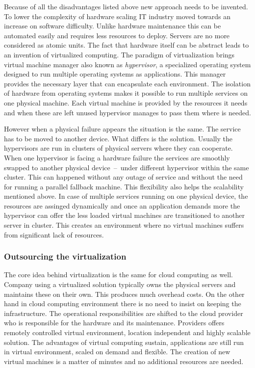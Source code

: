 Because of all the disadvantages listed above new approach needs to be invented. To lower the complexity of hardware scaling IT industry moved towards an increase on software difficulty. Unlike hardware maintenance this can be automated easily and requires less resources to deploy. Servers are no more considered as atomic units. The fact that hardware itself can be abstract leads to an invention of virtualized computing. The paradigm of virtualization brings virtual machine manager also known as \emph{hypervisor}, a specialized operating system designed to run multiple operating systems as applications. This manager provides the necessary layer that can encapsulate each environment. The isolation of hardware from operating systems makes it possible to run multiple services on one physical machine. Each virtual machine is provided by the resources it needs and when these are left unused hypervisor manages to pass them where is needed.

However when a physical failure appears the situation is the same. The service has to be moved to another device. What differs is the solution. Usually the hypervisors are run in clusters of physical servers where they can cooperate. When one hypervisor is facing a hardware failure the services are smoothly swapped to another physical device \,--\, under different hypervisor within the same cluster. This can happened without any outage of service and without the need for running a parallel fallback machine. This flexibility also helps the scalability mentioned above. In case of multiple services running on one physical device, the resources are assinged dynamically and once an application demands more the hypervisor can offer the less loaded virtual machines are transitioned to another server in cluster. This creates an environment where no virtual machines suffers from significant lack of resources.

\subsubsection{Outsourcing the virtualization}
\label{subs:Outsourcing the virtualization}

The core idea behind virtualization is the same for cloud computing as well. Company using a virtualized solution typically owns the physical servers and maintains these on their own. This produces much overhead costs. On the other hand in cloud computing environment there is no need to insist on keeping the infrastructure. The operational responsibilities are shifted to the cloud provider who is responsible for the hardware and its maintenance. Providers offers remotely controlled virtual environment, location independent and highly scalable solution. The advantages of virtual computing sustain, applications are still run in virtual environment, scaled on demand and flexible. The creation of new virtual machines is a matter of minutes and no additional resources are needed.


